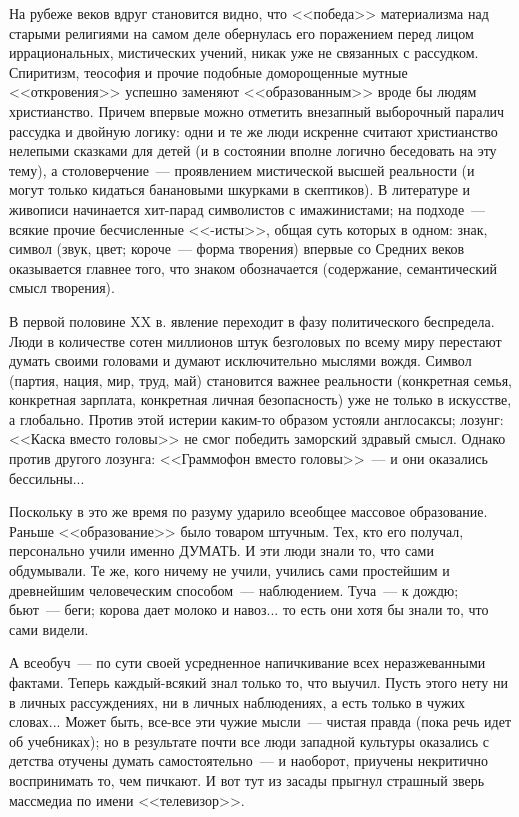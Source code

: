 \documentclass{scrbook}
\newcommand{\flqq}{<<}
\newcommand{\frqq}{>>}
\newcommand{\mdash}{~--- }
\begin{document}
На рубеже веков вдруг становится видно, что {\flqq}победа{\frqq} материализма над старыми религиями на самом деле обернулась его поражением перед лицом иррациональных, мистических учений, никак уже не связанных с рассудком. Спиритизм, теософия и прочие подобные доморощенные мутные {\flqq}откровения{\frqq} успешно заменяют {\flqq}образованным{\frqq} вроде бы людям христианство. Причем впервые можно отметить внезапный выборочный паралич рассудка и двойную логику: одни и те же люди искренне считают христианство нелепыми сказками для детей (и в состоянии вполне логично беседовать на эту тему), а столоверчение{\mdash}проявлением мистической высшей реальности (и могут только кидаться банановыми шкурками в скептиков). В литературе и живописи начинается хит-парад символистов с имажинистами; на подходе{\mdash}всякие прочие бесчисленные {\flqq}-исты{\frqq}, общая суть которых в одном: знак, символ (звук, цвет; короче{\mdash}форма творения) впервые со Средних веков оказывается главнее того, что знаком обозначается (содержание, семантический смысл творения).

В первой половине XX в. явление переходит в фазу политического беспредела. Люди в количестве сотен миллионов штук безголовых по всему миру перестают думать своими головами и думают исключительно мыслями вождя. Символ (партия, нация, мир, труд, май) становится важнее реальности (конкретная семья, конкретная зарплата, конкретная личная безопасность) уже не только в искусстве, а глобально. Против этой истерии каким-то образом устояли англосаксы; лозунг: {\flqq}Каска вместо головы{\frqq} не смог победить заморский здравый смысл. Однако против другого лозунга: {\flqq}Граммофон вместо головы{\frqq}{\mdash}и они оказались бессильны...

Поскольку в это же время по разуму ударило всеобщее массовое образование. Раньше {\flqq}образование{\frqq} было товаром штучным. Тех, кто его получал, персонально учили именно ДУМАТЬ. И эти люди знали то, что сами обдумывали. Те же, кого ничему не учили, учились сами простейшим и древнейшим человеческим способом{\mdash}наблюдением. Туча{\mdash}к дождю; бьют{\mdash}беги; корова дает молоко и навоз... то есть они хотя бы знали то, что сами видели.

А всеобуч{\mdash}по сути своей усредненное напичкивание всех неразжеванными фактами. Теперь каждый-всякий знал только то, что выучил. Пусть этого нету ни в личных рассуждениях, ни в личных наблюдениях, а есть только в чужих словах... Может быть, все-все эти чужие мысли{\mdash}чистая правда (пока речь идет об учебниках); но в результате почти все люди западной культуры оказались с детства отучены думать самостоятельно{\mdash}и наоборот, приучены некритично воспринимать то, чем пичкают. И вот тут из засады прыгнул страшный зверь массмедиа по имени {\flqq}телевизор{\frqq}.
\end{document}
